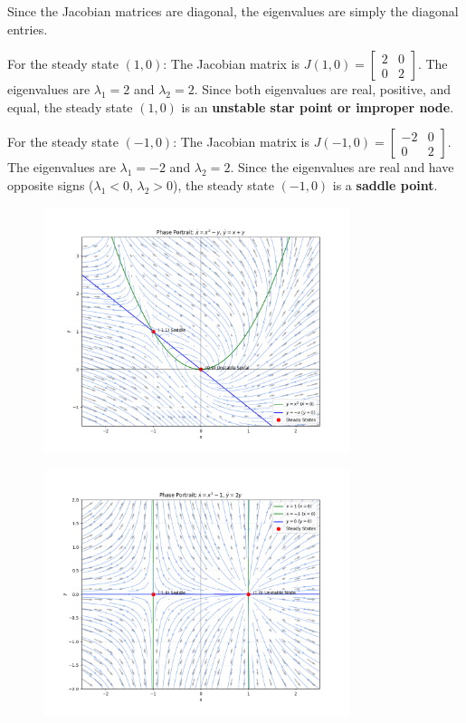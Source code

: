 \documentclass[]{scrartcl}
\begin{document}
Since the Jacobian matrices are diagonal, the eigenvalues are simply the diagonal entries.

For the steady state $(1,0)$:
The Jacobian matrix is $J(1,0) = \begin{bmatrix} 2 & 0 \\ 0 & 2 \end{bmatrix}$.
The eigenvalues are $\lambda_1 = 2$ and $\lambda_2 = 2$.
Since both eigenvalues are real, positive, and equal, the steady state $(1,0)$ is an \textbf{unstable star point or improper node}.

For the steady state $(-1,0)$:
The Jacobian matrix is $J(-1,0) = \begin{bmatrix} -2 & 0 \\ 0 & 2 \end{bmatrix}$.
The eigenvalues are $\lambda_1 = -2$ and $\lambda_2 = 2$.
Since the eigenvalues are real and have opposite signs ($\lambda_1 < 0$, $\lambda_2 > 0$), the steady state $(-1,0)$ is a \textbf{saddle point}.


\begin{figure}[H]
    \centering
    \includegraphics[width=0.8\textwidth]{phase_portrait_1.png}
\end{figure}

\begin{figure}[H]
    \centering
    \includegraphics[width=0.8\textwidth]{phase_portrait_2.png}
\end{figure}
\end{document}
